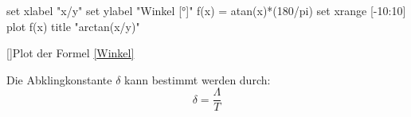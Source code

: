 \documentclass[12pt,a4paper,]{scrreprt}
\begin{document}
       \begin{gnuplot}[terminal=pdf,terminaloptions={font ",10" linewidth 3},scale=1.2]
        	set xlabel "x/y"
            set ylabel "Winkel [°]"
            f(x) = atan(x)*(180/pi)
            set xrange [-10:10]
            plot f(x) title "arctan(x/y)"
		\end{gnuplot} 
        []{Plot der Formel \ref{Winkel}}
        
		Die Abklingkonstante $\delta$ kann bestimmt werden durch: 
		\begin{equation}
			\delta = \frac{\Lambda}{T}
            \label{abkling}
		\end{equation}
		\pagebreak
        
        
        
        
        
        
        
\end{document}
